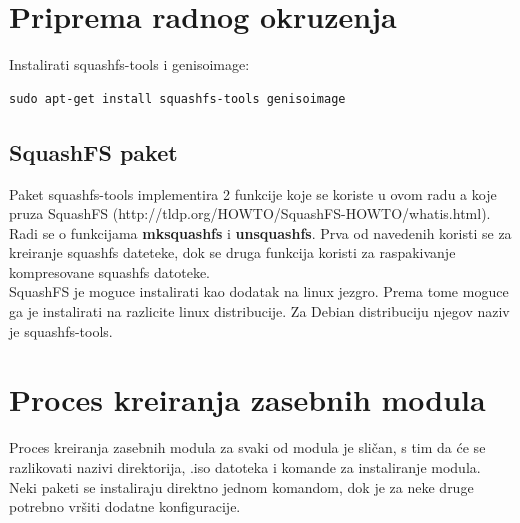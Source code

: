 \documentclass[12pt,vi]{mitthesis}
\begin{document}
\chapter*{Priprema radnog okruzenja}
Instalirati squashfs-tools i genisoimage:
\begin{lstlisting}[style=BashInputStyle]
sudo apt-get install squashfs-tools genisoimage
\end{lstlisting}

\section*{SquashFS paket}
Paket squashfs-tools implementira 2 funkcije koje se koriste u ovom radu a koje pruza SquashFS (http://tldp.org/HOWTO/SquashFS-HOWTO/whatis.html).
Radi se o funkcijama \textbf{mksquashfs} i \textbf{unsquashfs}. Prva od navedenih koristi se za kreiranje squashfs dateteke, dok se druga funkcija koristi za raspakivanje kompresovane squashfs datoteke.\\
SquashFS je moguce instalirati kao dodatak na linux jezgro. Prema tome moguce ga je instalirati na razlicite linux distribucije. Za Debian distribuciju njegov naziv je squashfs-tools.

\chapter*{Proces kreiranja zasebnih modula}
\indent
Proces kreiranja zasebnih modula za svaki od modula je sličan, s tim da će se razlikovati nazivi direktorija, .iso datoteka i komande za instaliranje modula. Neki paketi se instaliraju direktno jednom komandom, dok je za neke druge potrebno vršiti dodatne konfiguracije.
\end{document}
